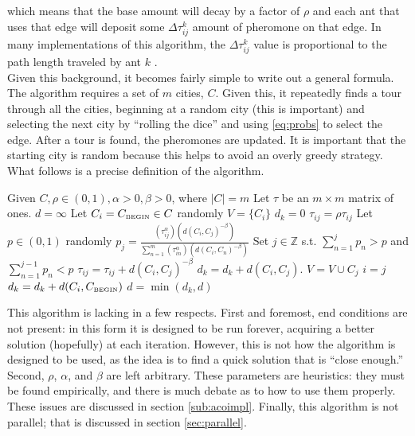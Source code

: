 \documentclass[twocolumn]{article}
\begin{document}
which means that the base amount will decay by a factor of $\rho$ and each ant
that uses that edge will deposit some $\Delta\tau^k_{ij}$ amount of pheromone on
that edge. In many implementations of this algorithm, the $\Delta\tau^k_{ij}$
value is proportional to the path length traveled by ant $k$ \cite{iridia:aco} 
\cite{ipcsit:aco} \cite{jungblut:aco}. \\ 

Given this background, it becomes fairly simple to write out a general 
formula. The algorithm requires a set of $m$ cities, $C$. Given this, 
it repeatedly finds a tour through all the cities, beginning at a random city
(this is important) and selecting the next city by ``rolling the dice'' and
using \eqref{eq:probs} to select the edge. After a tour is found, the 
pheromones are updated. It is important that the starting city is random 
because this helps to avoid an overly greedy strategy. What follows is a
precise definition of the algorithm. \\

\begin{algorithmic}
  \State Given $C, \rho \in (0,1), \alpha > 0, \beta > 0$, where $|C| = m$
  \State Let $\tau$ be an $m \times m$ matrix of ones.
  \State $d = \infty$
    \State Let $C_i = C_{\mbox{{\tiny BEGIN}}}\in C$ randomly
    \State $V = \{ C_i \}$
    \State $d_k = 0$
    \State $\tau_{ij} = \rho \tau_{ij}$
       \State Let $p \in (0,1)$ randomly
       \State $\displaystyle p_j = \frac{(\tau_{ij}^\alpha)(d(C_i,C_j)^{-\beta})}{\sum_{n=1}^m 
         (\tau_{in}^\alpha) (d(C_i,C_n)^{-\beta})}$
       \State Set $j \in \mathbb{Z}$ s.t. $\displaystyle \sum_{n=1}^j p_n > p$ and 
       $\displaystyle \sum_{n=1}^{j-1} p_n < p$
       \State $\tau_{ij} = \tau_{ij} + d(C_i,C_j)^{-\beta}$
       \State $d_k = d_k + d(C_i,C_j)$.
       \State $V = V \cup C_j$
       \State $i = j$
    \EndWhile
    \State $d_k = d_k + d(C_i,C_{\mbox{{\tiny BEGIN}}})$
    \State $d = \min (d_k, d)$
  \EndFor \\
\end{algorithmic}

This algorithm is lacking in a few respects. First and foremost, end conditions are not present:
in this form it is designed to be run forever, acquiring a better solution (hopefully) at each
iteration. However, this is not how the algorithm is designed to be used, as the idea is to find
a quick solution that is ``close enough.'' Second, $\rho$, $\alpha$, and $\beta$ are left 
arbitrary. These parameters are heuristics: they must be found empirically, and there is much 
debate as to how to use them properly. These issues are discussed in section \ref{sub:acoimpl}.
Finally, this algorithm is not parallel; that is discussed in section \ref{sec:parallel}. \\
\end{document}
